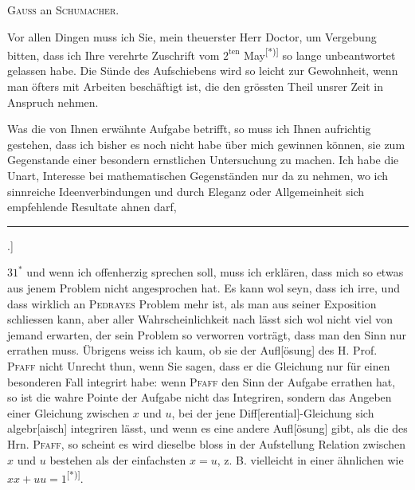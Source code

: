 \begingroup
{}
\begin{center}\textsc{Gauss} an \textsc{Schumacher}.\end{center}
\par\indent Vor allen Dingen muss ich Sie, mein theuerster Herr Doctor, um Vergebung bitten, dass ich Ihre verehrte Zuschrift vom $2^{\mathrm{ten}}$ May\textsuperscript{[*)]} so lange unbeantwortet gelassen habe. Die Sünde des Aufschiebens wird so leicht zur Gewohnheit, wenn man öfters mit Arbeiten beschäftigt ist, die den grössten Theil unsrer Zeit in Anspruch nehmen.

\par\indent Was die von Ihnen erwähnte Aufgabe betrifft, so muss ich Ihnen aufrichtig gestehen, dass ich bisher es noch nicht habe über mich gewinnen können, sie zum Gegenstande einer besondern ernstlichen Untersuchung zu machen. Ich habe die Unart,  Interesse bei mathematischen Gegenständen nur da zu nehmen, wo ich sinnreiche Ideenverbindungen und durch Eleganz oder Allgemeinheit sich empfehlende Resultate ahnen darf,
\par\vfill\noindent\rule{.25\linewidth}{.4pt}\par\smallskip
\begingroup\footnotesize\noindent [*) So in der Handschrift; richtig wäre \textls[120]{April}.]\par\endgroup
\smallskip\noindent\hfill\small $31^{*}$\normalsize
\clearpage
{}
\noindent und wenn ich offenherzig sprechen soll, muss ich erklären, dass mich so etwas aus jenem Problem nicht angesprochen hat. Es kann wol seyn, dass ich irre, und dass wirklich an \textsc{Pedrayes} Problem mehr ist, als man aus seiner Exposition schliessen kann, aber aller Wahrscheinlichkeit nach lässt sich wol nicht viel von jemand erwarten, der sein Problem so verworren vorträgt, dass man den Sinn nur errathen muss. Übrigens weiss ich kaum, ob sie der Aufl[ösung] des H. Prof. \textsc{Pfaff} nicht Unrecht thun, wenn Sie sagen, dass er die Gleichung nur für einen besonderen Fall integrirt habe: wenn \textsc{Pfaff} den Sinn der Aufgabe errathen hat, so ist die wahre Pointe der Aufgabe nicht das Integriren, sondern das Angeben einer Gleichung zwischen $x$ und $u$, bei der jene Diff[erential]-Gleichung sich algebr[aisch] integriren lässt, und wenn es eine andere Aufl[ösung] gibt, als die des Hrn. \textsc{Pfaff}, so scheint es wird dieselbe bloss in der Aufstellung  Relation zwischen $x$ und $u$ bestehen als der einfachsten $x=u$, z. B. vielleicht in einer ähnlichen wie $xx+uu=1$\textsuperscript{[*)]}.

